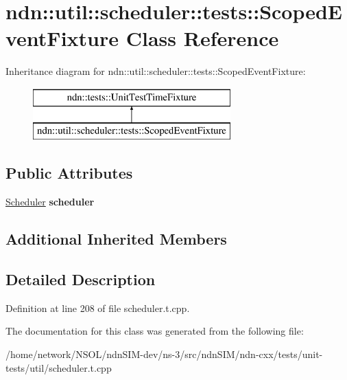\hypertarget{classndn_1_1util_1_1scheduler_1_1tests_1_1ScopedEventFixture}{}\section{ndn\+:\+:util\+:\+:scheduler\+:\+:tests\+:\+:Scoped\+Event\+Fixture Class Reference}
\label{classndn_1_1util_1_1scheduler_1_1tests_1_1ScopedEventFixture}
Inheritance diagram for ndn\+:\+:util\+:\+:scheduler\+:\+:tests\+:\+:Scoped\+Event\+Fixture\+:\begin{figure}[H]
\begin{center}
\leavevmode
\includegraphics[height=2.000000cm]{classndn_1_1util_1_1scheduler_1_1tests_1_1ScopedEventFixture}
\end{center}
\end{figure}
\subsection*{Public Attributes}
\begin{DoxyCompactItemize}
\item 
\hyperlink{classndn_1_1util_1_1scheduler_1_1Scheduler}{Scheduler} {\bfseries scheduler}\hypertarget{classndn_1_1util_1_1scheduler_1_1tests_1_1ScopedEventFixture_ab3e1520e017049c2b4f869d2ecdd3d31}{}\label{classndn_1_1util_1_1scheduler_1_1tests_1_1ScopedEventFixture_ab3e1520e017049c2b4f869d2ecdd3d31}

\end{DoxyCompactItemize}
\subsection*{Additional Inherited Members}


\subsection{Detailed Description}


Definition at line 208 of file scheduler.\+t.\+cpp.



The documentation for this class was generated from the following file\+:\begin{DoxyCompactItemize}
\item 
/home/network/\+N\+S\+O\+L/ndn\+S\+I\+M-\/dev/ns-\/3/src/ndn\+S\+I\+M/ndn-\/cxx/tests/unit-\/tests/util/scheduler.\+t.\+cpp\end{DoxyCompactItemize}
